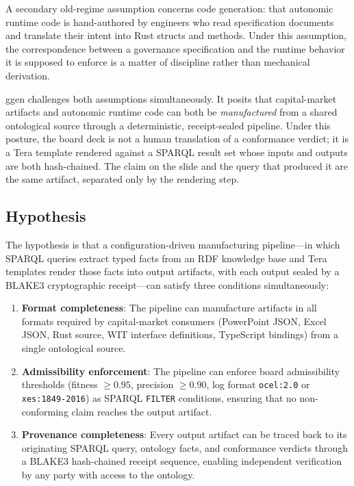 A secondary old-regime assumption concerns code generation: that autonomic runtime code is
hand-authored by engineers who read specification documents and translate their intent into Rust
structs and methods. Under this assumption, the correspondence between a governance specification
and the runtime behavior it is supposed to enforce is a matter of discipline rather than
mechanical derivation.

ggen challenges both assumptions simultaneously. It posits that capital-market artifacts and
autonomic runtime code can both be \emph{manufactured} from a shared ontological source through
a deterministic, receipt-sealed pipeline. Under this posture, the board deck is not a human
translation of a conformance verdict; it is a Tera template rendered against a SPARQL result set
whose inputs and outputs are both hash-chained. The claim on the slide and the query that produced
it are the same artifact, separated only by the rendering step.

\subsection{Hypothesis}
\label{sec:ggen-rq-hypothesis}

The hypothesis is that a configuration-driven manufacturing pipeline---in which SPARQL queries
extract typed facts from an RDF knowledge base and Tera templates render those facts into output
artifacts, with each output sealed by a BLAKE3 cryptographic receipt---can satisfy three
conditions simultaneously:

\begin{enumerate}
  \item \textbf{Format completeness}: The pipeline can manufacture artifacts in all formats
    required by capital-market consumers (PowerPoint JSON, Excel JSON, Rust source, WIT interface
    definitions, TypeScript bindings) from a single ontological source.
  \item \textbf{Admissibility enforcement}: The pipeline can enforce board admissibility
    thresholds (fitness $\geq 0.95$, precision $\geq 0.90$, log format \texttt{ocel:2.0} or
    \texttt{xes:1849-2016}) as SPARQL \texttt{FILTER} conditions, ensuring that no
    non-conforming claim reaches the output artifact.
  \item \textbf{Provenance completeness}: Every output artifact can be traced back to its
    originating SPARQL query, ontology facts, and conformance verdicts through a BLAKE3
    hash-chained receipt sequence, enabling independent verification by any party with access to
    the ontology.
\end{enumerate}

